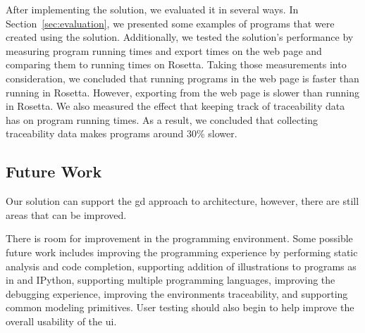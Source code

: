 After implementing the solution, we evaluated it in several ways.
In Section~\ref{sec:evaluation}, we presented some examples of programs that were created using the solution.
Additionally, we tested the solution's performance by measuring program running times and export times on the web page and comparing them to running times on Rosetta.
Taking those measurements into consideration, we concluded that running programs in the web page is faster than running in Rosetta.
However, exporting from the web page is slower than running in Rosetta.
We also measured the effect that keeping track of traceability data has on program running times.
As a result, we concluded that collecting traceability data makes programs around 30\% slower.



\subsection{Future Work}
Our solution can support the \gls{gd} approach to architecture, however, there are still areas that can be improved.



There is room for improvement in the programming environment.
Some possible future work includes improving the programming experience by performing static analysis and code completion, supporting addition of illustrations to programs as in \cite{Leitao2014illustrated} and IPython, supporting multiple programming languages, improving the debugging experience, improving the environments traceability, and supporting common modeling primitives.
User testing should also begin to help improve the overall usability of the \gls{ui}.



